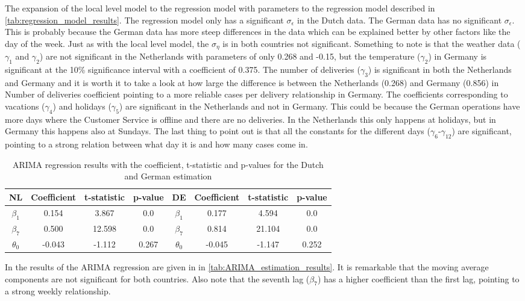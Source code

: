 The expansion of the local level model to the regression model with parameters to the regression model described in \autoref{tab:regression_model_results}. The regression model only has a significant $\sigma_{\epsilon}$ in the Dutch data. The German data has no significant $\sigma_\epsilon$. This is probably because the German data has more steep differences in the data which can be explained better by other factors like the day of the week. Just as with the local level model, the $\sigma_\eta$ is in both countries not significant. Something to note is that the weather data ($\gamma_1$ and $\gamma_2$) are not significant in the Netherlands with parameters of only 0.268 and -0.15, but the temperature ($\gamma_2$) in Germany is significant at the 10\% significance interval with a coefficient of 0.375. The number of deliveries ($\gamma_3$) is significant in both the Netherlands and Germany and it is worth it to take a look at how large the difference is between the Netherlands (0.268) and Germany (0.856) in Number of deliveries coefficient pointing to a more reliable cases per delivery relationship in Germany. The coefficients corresponding to vacations ($\gamma_4$) and holidays ($\gamma_5$) are significant in the Netherlands and not in Germany. This could be because the German operations have more days where the Customer Service is offline and there are no deliveries. In the Netherlands this only happens at holidays, but in Germany this happens also at Sundays. The last thing to point out is that all the constants for the different days ($\gamma_6$-$\gamma_{12}$) are significant, pointing to a strong relation between what day it is and how many cases come in.\\

\begin{table}[]
    \centering
    \begin{tabular}{|c|c c c||c|c c c|}\hline
        NL & Coefficient & t-statistic & p-value & DE & Coefficient & t-statistic & p-value\\\hline
        $\beta_1$ & 0.154 & 3.867 & 0.0 & $\beta_1$ & 0.177 & 4.594 & 0.0\\
        $\beta_7$ & 0.500 & 12.598 & 0.0 & $\beta_7$ & 0.814 & 21.104 & 0.0\\
        $\theta_0$ & -0.043 & -1.112 & 0.267 & $\theta_0$ & -0.045 & -1.147 & 0.252\\\hline
    \end{tabular}
    \caption{ARIMA regression results with the coefficient, t-statistic and p-values for the Dutch and German estimation}
    \label{tab:ARIMA_estimation_results}
\end{table}
In the results of the ARIMA regression are given in in \autoref{tab:ARIMA_estimation_results}. It is remarkable that the moving average components are not significant for both countries. Also note that the seventh lag ($\beta_7$) has a higher coefficient than the first lag, pointing to a strong weekly relationship.\\

